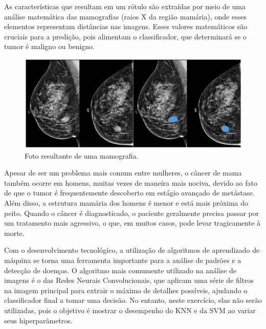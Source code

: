 \documentclass{article} %
\begin{document}
   As características que resultam em um rótulo são extraídas por meio de uma análise matemática das mamografias (raios X da região mamária), onde esses elementos representam distâncias nas imagens. Esses valores matemáticos são cruciais para a predição, pois alimentam o classificador, que determinará se o tumor é maligno ou benigno.

   \vspace{1cm}

   \begin{figure}[h] %
      \centering %
      \includegraphics[width=0.75\linewidth]{mamografia.jpg} %
      \caption{Foto resultante de uma mamografia.} %
      \label{fig:exemplo} %
   \end{figure}

   \vspace{1cm}

   Apesar de ser um problema mais comum entre mulheres, o câncer de mama também ocorre em homens, muitas vezes de maneira mais nociva, devido ao fato de que o tumor é frequentemente descoberto em estágio avançado de metástase. Além disso, a estrutura mamária dos homens é menor e está mais próxima do peito. Quando o câncer é diagnosticado, o paciente geralmente precisa passar por um tratamento mais agressivo, o que, em muitos casos, pode levar tragicamente à morte.

   Com o desenvolvimento tecnológico, a utilização de algoritmos de aprendizado de máquina se torna uma ferramenta importante para a análise de padrões e a detecção de doenças. O algoritmo mais comumente utilizado na análise de imagens é o das Redes Neurais Convolucionais, que aplicam uma série de filtros na imagem principal para extrair o máximo de detalhes possíveis, ajudando o classificador final a tomar uma decisão. No entanto, neste exercício, elas não serão utilizadas, pois o objetivo é mostrar o desempenho do KNN e da SVM ao variar seus hiperparâmetros.
\end{document}
